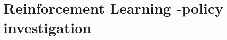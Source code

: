 \documentclass[a4paper,twoside,10pt,final]{memoir} %
\begin{document}
%
%
%
%
%


\clearemptydoublepage
\chapter{Reinforcement Learning -policy investigation}
\label{chap:chap_RL}

\clearpage

%
%
%
%
\end{document}
